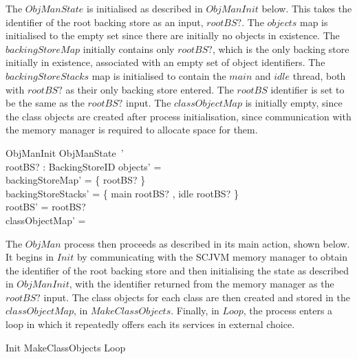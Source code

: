 The $ObjManState$ is initialised as described in $ObjManInit$ below.
This takes the identifier of the root backing store as an input,
$rootBS?$.
The $objects$ map is initialised to the empty set since there are
initially no objects in existence.
The $backingStoreMap$ initially contains only $rootBS?$, which is the
only backing store initially in existence, associated with an empty
set of object identifiers.
The $backingStoreStacks$ map is initialised to contain the $main$ and
$idle$ thread, both with $rootBS?$ as their only backing store
entered.
The $rootBS$ identifier is set to be the same as the $rootBS?$ input.
The $classObjectMap$ is initially empty, since the class objects are
created after process initialisation, since communication with the
memory manager is required to allocate space for them.
\begin{schema}{ObjManInit}
  ObjManState~' \\
  rootBS? : BackingStoreID
\where
  objects' = \emptyset \\
  backingStoreMap' = \{ rootBS? \mapsto \emptyset \} \\
  backingStoreStacks' = \{ main \mapsto \langle rootBS? \rangle, idle \mapsto \langle rootBS? \rangle \} \\
  rootBS' = rootBS? \\
  classObjectMap' = \emptyset
\end{schema}

The $ObjMan$ process then proceeds as described in its main action,
shown below.
It begins in $Init$ by communicating with the SCJVM memory manager to
obtain the identifier of the root backing store and then initialising
the state as described in $ObjManInit$, with the identifier returned
from the memory manager as the $rootBS?$ input.
The class objects for each class are then created and stored in the
$classObjectMap$, in $MakeClassObjects$.
Finally, in $Loop$, the process enters a loop in which it repeatedly
offers each its services in external choice.
\begin{circusaction}
  \circspot Init \circseq MakeClassObjects \circseq Loop
\end{circusaction}


